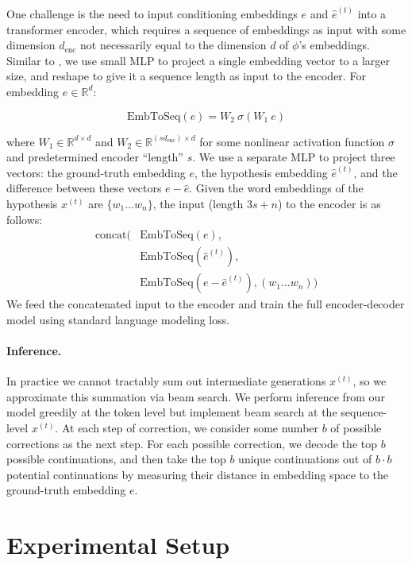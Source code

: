 \documentclass[11pt]{article}
\begin{document}
One challenge is the need to input conditioning embeddings $e$ and $\hat{e}^{(t)}$ into a transformer encoder, which requires a sequence of embeddings as input with some dimension $d_{\text{enc}}$ not necessarily equal to the dimension $d$ of $\phi$'s embeddings.
Similar to \citet{mokady2021clipcap}, we use small MLP to project a single embedding vector to a larger size, and reshape to give it a sequence length as input to the encoder. For embedding $e \in \mathbb{R}^d$:

\[
\text{EmbToSeq}(e) = W_2 \  \sigma(W_1\   e)
\]

\noindent where $W_1 \in \mathbb{R}^{d \times d}$ and $W_2 \in \mathbb{R}^{(s d_{\text{enc}}) \times d}$ for some nonlinear activation function $\sigma$ and predetermined encoder ``length'' $s$. We use a separate MLP to project three vectors: the ground-truth embedding $e$, the hypothesis embedding $\hat{e}^{(t)}$, and the difference between these vectors $e - \hat{e}$. Given the word embeddings of the hypothesis $x^{(t)}$ are $\{w_1 ... w_n\}$, the input (length $3s + n$) to the encoder is as follows:
\begin{align*}
\text{concat}(
&\text{EmbToSeq}(e), \\
&\text{EmbToSeq}(\hat{e}^{(t)}), \\
& \text{EmbToSeq}(e - \hat{e}^{(t)}),  (w_1 ... w_n)
)
\end{align*}
We feed the concatenated input to the encoder and train the full encoder-decoder model using standard language modeling loss.

\paragraph{Inference.} In practice we cannot tractably sum out intermediate generations $x^{(t)}$, so we approximate this summation via beam search.
 We perform inference from our model greedily at the token level but implement beam search at the sequence-level $x^{(t)}$. At each step of correction, we consider some number $b$ of possible corrections as the next step. For each possible correction, we decode the top $b$ possible continuations, and then take the top $b$ unique continuations out of $b \cdot b$ potential continuations by measuring their distance in embedding space to the ground-truth embedding $e$.

\section{Experimental Setup}
\label{sec:experimental-setup}
\end{document}
